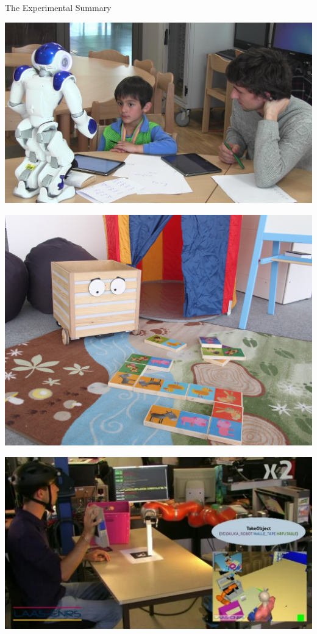 \documentclass[compress]{beamer}
\begin{document}
{{\begin{frame}{The Experimental Summary}
\begin{multicols}{4}
        \includegraphics[width=\columnwidth]{realSetup}

        \includegraphics[width=\columnwidth]{ranger-background}

        \includegraphics[width=\columnwidth]{cleantable}


\end{multicols}
\end{frame}}}
\end{document}

